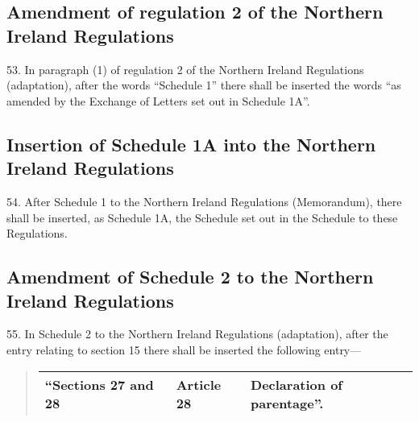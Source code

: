 \documentclass[12pt,a4paper]{article}
\begin{document}
\subsection[53. Amendment of regulation 2 of the Northern Ireland Regulations]{\sloppy Amendment of regulation 2 of the Northern Ireland Regulations}

53.  In paragraph (1) of regulation 2 of the Northern Ireland Regulations (adaptation), after the words “Schedule 1” there shall be inserted the words “as amended by the Exchange of Letters set out in Schedule 1A”.

\subsection[54. Insertion of Schedule 1A into the Northern Ireland Regulations]{Insertion of Schedule 1A into the Northern Ireland Regulations}

54.  After Schedule 1 to the Northern Ireland Regulations (Memorandum), there shall be inserted, as Schedule 1A, the Schedule set out in the Schedule to these Regulations.

\subsection[55. Amendment of Schedule 2 to the Northern Ireland Regulations]{Amendment of Schedule 2 to the Northern Ireland Regulations}

55.  In Schedule 2 to the Northern Ireland Regulations (adaptation), after the entry relating to section 15 there shall be inserted the following entry—
\begin{quotation}
\noindent
\begin{tabular}{lll}
\hline
“Sections 27 and 28 & Article 28 & Declaration of parentage”.\\
\hline
\end{tabular}
\end{quotation}

%
\end{document}
